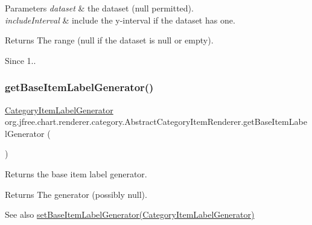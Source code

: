 \begin{DoxyParams}{Parameters}
{\em dataset} & the dataset ({\ttfamily null} permitted). \\
\hline
{\em include\+Interval} & include the y-\/interval if the dataset has one.\\
\hline
\end{DoxyParams}
\begin{DoxyReturn}{Returns}
The range ({\ttfamily null} if the dataset is {\ttfamily null} or empty).
\end{DoxyReturn}
\begin{DoxySince}{Since}
1.. 
\end{DoxySince}
\mbox{\label{classorg_1_1jfree_1_1chart_1_1renderer_1_1category_1_1_abstract_category_item_renderer_a8cb1f3366a62871739928e4b5c75ade5}} 
\subsubsection{\texorpdfstring{get\+Base\+Item\+Label\+Generator()}{getBaseItemLabelGenerator()}}
{\footnotesize\ttfamily \mbox{\hyperlink{interfaceorg_1_1jfree_1_1chart_1_1labels_1_1_category_item_label_generator}{Category\+Item\+Label\+Generator}} org.\+jfree.\+chart.\+renderer.\+category.\+Abstract\+Category\+Item\+Renderer.\+get\+Base\+Item\+Label\+Generator (\begin{DoxyParamCaption}{ }\end{DoxyParamCaption})}

Returns the base item label generator.

\begin{DoxyReturn}{Returns}
The generator (possibly {\ttfamily null}).
\end{DoxyReturn}
\begin{DoxySeeAlso}{See also}
\mbox{\hyperlink{classorg_1_1jfree_1_1chart_1_1renderer_1_1category_1_1_abstract_category_item_renderer_a3752262b1c62f959e47ba3542e1e7149}{set\+Base\+Item\+Label\+Generator(\+Category\+Item\+Label\+Generator)}} 
\end{DoxySeeAlso}


